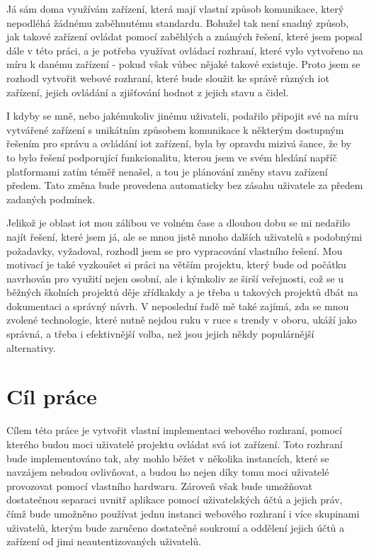 Já sám doma využívám zařízení, která mají vlastní způsob komunikace, který nepodléhá žádnému zaběhnutému standardu. Bohužel tak není snadný způsob, jak takové zařízení ovládat pomocí zaběhlých a známých řešení, které jsem popsal dále v této práci, a je potřeba využívat ovládací rozhraní, které vylo vytvořeno na míru k danému zařízení - pokud však vůbec nějaké takové existuje. Proto jsem se rozhodl vytvořit webové rozhraní, které bude sloužit ke správě různých \acrshort{iot} zařízení, jejich ovládání a zjišťování hodnot z jejich stavu a čidel.

I kdyby se mně, nebo jakémukoliv jinému uživateli, podařilo připojit své na míru vytvářené zařízení s unikátním způsobem komunikace k některým dostupným řešením pro správu a ovládání \acrshort{iot} zařízení, byla by opravdu mizivá šance, že by to bylo řešení podporující funkcionalitu, kterou jsem ve svém hledání napříč platformami zatím téměř nenašel, a tou je plánování změny stavu zařízení předem. Tato změna bude provedena automaticky bez zásahu uživatele za předem zadaných podmínek.

Jelikož je oblast \acrshort{iot} mou zálibou ve volném čase a dlouhou dobu se mi nedařilo najít řešení, které jsem já, ale se mnou jistě mnoho dalších uživatelů s podobnými požadavky, vyžadoval, rozhodl jsem se pro vypracování vlastního řešení. Mou motivací je také vyzkoušet si práci na větším projektu, který bude od počátku navrhován pro využití nejen osobní, ale i kýmkoliv ze širší veřejnosti, což se u běžných školních projektů děje zřídkakdy a je třeba u takových projektů dbát na dokumentaci a správný návrh. V neposlední řadě mě také zajímá, zda se mnou zvolené technologie, které nutně nejdou ruku v ruce s trendy v oboru, ukáží jako správná, a třeba i efektivnější volba, než jsou jejich někdy populárnější alternativy.



\chapter*{Cíl práce}
\setcounter{page}{2}

Cílem této práce je vytvořit vlastní implementaci webového rozhraní, pomocí kterého budou moci uživatelé projektu ovládat svá \acrshort{iot} zařízení. Toto rozhraní bude implementováno tak, aby mohlo běžet v několika instancích, které se navzájem nebudou ovlivňovat, a budou ho nejen díky tomu moci uživatelé provozovat pomocí vlastního hardwaru. Zároveň však bude umožňovat dostatečnou separaci uvnitř aplikace pomocí uživatelských účtů a jejich práv, čímž bude umožněno používat jednu instanci webového rozhraní i více skupinami uživatelů, kterým bude zaručeno dostatečné soukromí a oddělení jejich účtů a zařízení od jimi neautentizovaných uživatelů.

